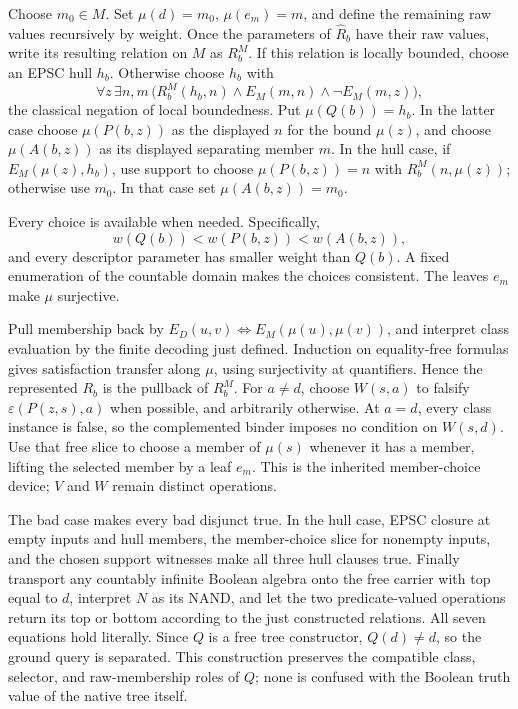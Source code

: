 Choose \(m_0\in M\).  Set \(\mu(d)=m_0\), \(\mu(e_m)=m\), and
define the remaining raw values recursively by weight.  Once the
parameters of \(\widehat R_b\) have their raw values, write its
resulting relation on \(M\) as \(R_b^M\).  If this relation is locally
bounded, choose an EPSC hull \(h_b\).  Otherwise choose \(h_b\) with
\[
 \forall z\,\exists n,m\,
      \bigl(R_b^M(h_b,n)\land E_M(m,n)\land\neg E_M(m,z)\bigr),
\]
the classical negation of local boundedness.  Put \(\mu(Q(b))=h_b\).
In the latter case choose \(\mu(P(b,z))\) as the displayed \(n\)
for the bound \(\mu(z)\), and choose \(\mu(A(b,z))\) as its displayed
separating member \(m\).  In the hull case, if
\(E_M(\mu(z),h_b)\), use support to choose \(\mu(P(b,z))=n\) with
\(R_b^M(n,\mu(z))\); otherwise use \(m_0\).  In that case set
\(\mu(A(b,z))=m_0\).

Every choice is available when needed.  Specifically,
\[
                   w(Q(b))<w(P(b,z))<w(A(b,z)),
\]
and every descriptor parameter has smaller weight than \(Q(b)\).
A fixed enumeration of the countable domain makes the choices consistent.
The leaves \(e_m\) make \(\mu\) surjective.

Pull membership back by \(E_D(u,v)\iff E_M(\mu(u),\mu(v))\), and
interpret class evaluation by the finite decoding just defined.  Induction
on equality-free formulas gives satisfaction transfer along \(\mu\),
using surjectivity at quantifiers.  Hence the represented \(R_b\) is
the pullback of \(R_b^M\).  For \(a\ne d\), choose \(W(s,a)\) to
falsify \(\varepsilon(P(z,s),a)\) when possible, and arbitrarily
otherwise.  At \(a=d\), every class instance is false, so the complemented
binder imposes no condition on \(W(s,d)\).  Use that free slice to choose
a member of \(\mu(s)\) whenever it has a member, lifting the selected
member by a leaf \(e_m\).  This is the inherited member-choice device;
\(V\) and \(W\) remain distinct operations.

The bad case makes every bad disjunct true.  In the hull case, EPSC closure
at empty inputs and hull members, the member-choice slice for nonempty
inputs, and the chosen support witnesses make all three hull clauses true.
Finally transport any countably infinite Boolean algebra onto the free
carrier with top equal to \(d\), interpret \(N\) as its NAND, and let
the two predicate-valued operations return its top or bottom according to
the just constructed relations.  All seven equations hold literally.
Since \(Q\) is a free tree constructor, \(Q(d)\ne d\), so the ground
query is separated.  This construction preserves the compatible class,
selector, and raw-membership roles of \(Q\); none is confused with the
Boolean truth value of the native tree itself.

